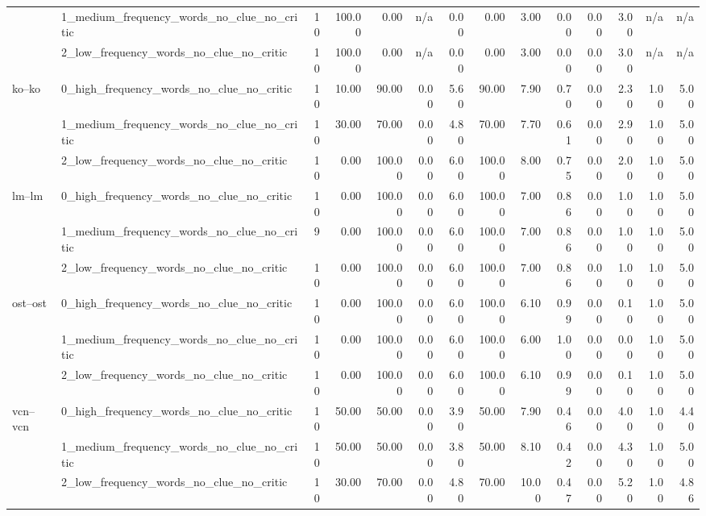 \begin{tabular}{llrrrrrrrrrrrr}
 & 1_medium_frequency_words_no_clue_no_critic & 10 & 100.00 & 0.00 & n/a & 0.00 & 0.00 & 3.00 & 0.00 & 0.00 & 3.00 & n/a & n/a \\
 & 2_low_frequency_words_no_clue_no_critic & 10 & 100.00 & 0.00 & n/a & 0.00 & 0.00 & 3.00 & 0.00 & 0.00 & 3.00 & n/a & n/a \\
\cline{1-14}
\multirow[t]{3}{*}{ko--ko} & 0_high_frequency_words_no_clue_no_critic & 10 & 10.00 & 90.00 & 0.00 & 5.60 & 90.00 & 7.90 & 0.70 & 0.00 & 2.30 & 1.00 & 5.00 \\
 & 1_medium_frequency_words_no_clue_no_critic & 10 & 30.00 & 70.00 & 0.00 & 4.80 & 70.00 & 7.70 & 0.61 & 0.00 & 2.90 & 1.00 & 5.00 \\
 & 2_low_frequency_words_no_clue_no_critic & 10 & 0.00 & 100.00 & 0.00 & 6.00 & 100.00 & 8.00 & 0.75 & 0.00 & 2.00 & 1.00 & 5.00 \\
\cline{1-14}
\multirow[t]{3}{*}{lm--lm} & 0_high_frequency_words_no_clue_no_critic & 10 & 0.00 & 100.00 & 0.00 & 6.00 & 100.00 & 7.00 & 0.86 & 0.00 & 1.00 & 1.00 & 5.00 \\
 & 1_medium_frequency_words_no_clue_no_critic & 9 & 0.00 & 100.00 & 0.00 & 6.00 & 100.00 & 7.00 & 0.86 & 0.00 & 1.00 & 1.00 & 5.00 \\
 & 2_low_frequency_words_no_clue_no_critic & 10 & 0.00 & 100.00 & 0.00 & 6.00 & 100.00 & 7.00 & 0.86 & 0.00 & 1.00 & 1.00 & 5.00 \\
\cline{1-14}
\multirow[t]{3}{*}{ost--ost} & 0_high_frequency_words_no_clue_no_critic & 10 & 0.00 & 100.00 & 0.00 & 6.00 & 100.00 & 6.10 & 0.99 & 0.00 & 0.10 & 1.00 & 5.00 \\
 & 1_medium_frequency_words_no_clue_no_critic & 10 & 0.00 & 100.00 & 0.00 & 6.00 & 100.00 & 6.00 & 1.00 & 0.00 & 0.00 & 1.00 & 5.00 \\
 & 2_low_frequency_words_no_clue_no_critic & 10 & 0.00 & 100.00 & 0.00 & 6.00 & 100.00 & 6.10 & 0.99 & 0.00 & 0.10 & 1.00 & 5.00 \\
\cline{1-14}
\multirow[t]{3}{*}{vcn--vcn} & 0_high_frequency_words_no_clue_no_critic & 10 & 50.00 & 50.00 & 0.00 & 3.90 & 50.00 & 7.90 & 0.46 & 0.00 & 4.00 & 1.00 & 4.40 \\
 & 1_medium_frequency_words_no_clue_no_critic & 10 & 50.00 & 50.00 & 0.00 & 3.80 & 50.00 & 8.10 & 0.42 & 0.00 & 4.30 & 1.00 & 5.00 \\
 & 2_low_frequency_words_no_clue_no_critic & 10 & 30.00 & 70.00 & 0.00 & 4.80 & 70.00 & 10.00 & 0.47 & 0.00 & 5.20 & 1.00 & 4.86 \\
\cline{1-14}
\bottomrule
\end{tabular}
